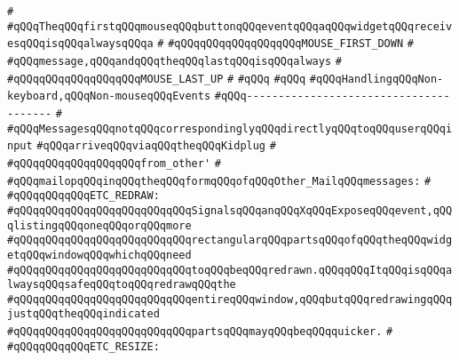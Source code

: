 \verb|#|\newline
\verb|#qQQqTheqQQqfirstqQQqmouseqQQqbuttonqQQqeventqQQqaqQQqwidgetqQQqreceivesqQQqisqQQqalwaysqQQqa|\newline
\verb|#|\newline
\verb|#qQQqqQQqqQQqqQQqqQQqMOUSE_FIRST_DOWN|\newline
\verb|#|\newline
\verb|#qQQqmessage,qQQqandqQQqtheqQQqlastqQQqisqQQqalways|\newline
\verb|#|\newline
\verb|#qQQqqQQqqQQqqQQqqQQqMOUSE_LAST_UP|\newline
\verb|#|\newline
\verb|#qQQq|\newline
\verb|#qQQq|\newline
\verb|#qQQqHandlingqQQqNon-keyboard,qQQqNon-mouseqQQqEvents|\newline
\verb|#qQQq---------------------------------------|\newline
\verb|#|\newline
\verb|#qQQqMessagesqQQqnotqQQqcorrespondinglyqQQqdirectlyqQQqtoqQQquserqQQqinput|\newline
\verb|#qQQqarriveqQQqviaqQQqtheqQQqKidplug|\newline
\verb|#|\newline
\verb|#qQQqqQQqqQQqqQQqqQQqfrom_other'|\newline
\verb|#|\newline
\verb|#qQQqmailopqQQqinqQQqtheqQQqformqQQqofqQQqOther_MailqQQqmessages:|\newline
\verb|#|\newline
\verb|#qQQqqQQqqQQqETC_REDRAW:|\newline
\verb|#qQQqqQQqqQQqqQQqqQQqqQQqqQQqSignalsqQQqanqQQqXqQQqExposeqQQqevent,qQQqlistingqQQqoneqQQqorqQQqmore|\newline
\verb|#qQQqqQQqqQQqqQQqqQQqqQQqqQQqrectangularqQQqpartsqQQqofqQQqtheqQQqwidgetqQQqwindowqQQqwhichqQQqneed|\newline
\verb|#qQQqqQQqqQQqqQQqqQQqqQQqqQQqtoqQQqbeqQQqredrawn.qQQqqQQqItqQQqisqQQqalwaysqQQqsafeqQQqtoqQQqredrawqQQqthe|\newline
\verb|#qQQqqQQqqQQqqQQqqQQqqQQqqQQqentireqQQqwindow,qQQqbutqQQqredrawingqQQqjustqQQqtheqQQqindicated|\newline
\verb|#qQQqqQQqqQQqqQQqqQQqqQQqqQQqpartsqQQqmayqQQqbeqQQqquicker.|\newline
\verb|#|\newline
\verb|#qQQqqQQqqQQqETC_RESIZE:|\newline
